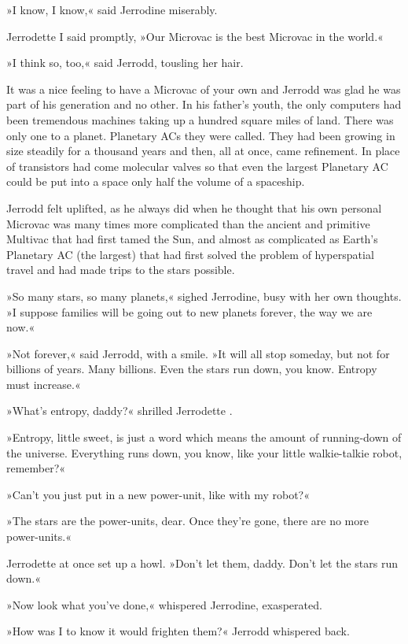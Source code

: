 \documentclass[11pt,twocolumn,paper=a5,pagesize,twoside]{article}
\newcommand{\q}[1]{»#1«}
\begin{document}
{\q{I know, I know,} said Jerrodine miserably.

Jerrodette I said promptly, \q{Our Microvac is the best Microvac in the 
world.}

\q{I think so, too,} said Jerrodd, tousling her hair.

It was a nice feeling to have a Microvac of your own and Jerrodd was glad he 
was part of his generation and no other. In his father's youth, the only 
computers had been tremendous machines taking up a hundred square miles of 
land. There was only one to a planet. Planetary ACs they were called. They 
had been growing in size steadily for a thousand years and then, all at 
once, came refinement. In place of transistors had come molecular valves so 
that even the largest Planetary AC could be put into a space only half the 
volume of a spaceship.

Jerrodd felt uplifted, as he always did when he thought that his own personal 
Microvac was many times more complicated than the ancient and primitive 
Multivac that had first tamed the Sun, and almost as complicated as Earth's 
Planetary AC (the largest) that had first solved the problem of hyperspatial 
travel and had made trips to the stars possible.

\q{So many stars, so many planets,} sighed Jerrodine, busy with her own 
thoughts. \q{I suppose families will be going out to new planets forever, 
the way we are now.}

\q{Not forever,} said Jerrodd, with a smile. \q{It will all stop someday, 
but not for billions of years. Many billions. Even the stars run down, 
you know. Entropy must increase.}

\q{What's entropy, daddy?} shrilled Jerrodette 
\MakeUppercase{}.

\q{Entropy, little sweet, is just a word which means the amount of 
running-down of the universe. Everything runs down, you know, like your 
little walkie-talkie robot, remember?}

\q{Can't you just put in a new power-unit, like with my robot?}

\q{The stars are the power-units, dear. Once they're gone, there are no 
more power-units.}

Jerrodette \MakeUppercase{} at once set up a howl. \q{Don't
let them, daddy. Don't let the stars run down.}

\q{Now look what you've done,} whispered Jerrodine, exasperated.

\q{How was I to know it would frighten them?} Jerrodd whispered back.

}
\end{document}
